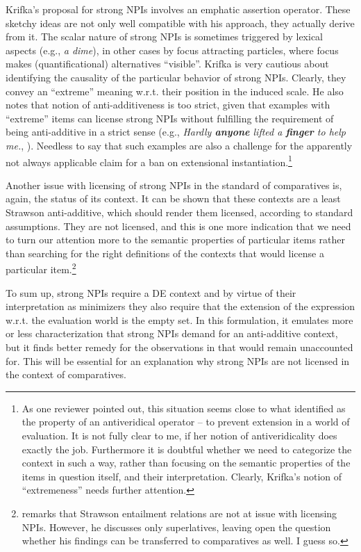 \documentclass[output=paper,colorlinks,citecolor=brown,
]{langscibook}
\begin{document}
Krifka's \citeyearpar{krifka1995} proposal for strong NPIs involves an emphatic assertion operator. These sketchy ideas are not
only well compatible with his approach, they actually derive from it. The scalar nature of strong NPIs is sometimes
triggered by lexical aspects (e.g., \emph{a dime}), in other cases by focus attracting particles, where focus makes
(quantificational) alternatives “visible”. Krifka is very cautious about identifying the causality of the particular
behavior of strong NPIs. Clearly, they convey an ``extreme'' meaning w.r.t. their position in the induced scale. He also
notes that  notion of anti-additiveness is too strict, given that examples with ``extreme'' items
can license strong NPIs without fulfilling the requirement of being anti-additive in a strict sense (e.g., \textit{Hardly \textbf{anyone}
lifted a \textbf{finger} to help me.}, \citealt{krifka1995}). Needless to say that such examples are also a challenge for the apparently not always applicable claim for a ban on
extensional instantiation.\footnote{As one reviewer pointed out, this situation seems close to what \citet{giannak2007} identified
as the property of an antiveridical operator -- to prevent extension in a world of evaluation. It is not fully
clear to me, if her notion of antiveridicality does exactly the job. Furthermore it is doubtful whether we need to categorize the context in such a way, rather than
focusing on the semantic properties of the items in question itself, and their interpretation. Clearly, Krifka's notion of
``extremeness'' needs further attention.}

Another issue with licensing of strong NPIs in the standard of comparatives is, again, the
status of its context. It can be shown that these contexts are a least Strawson anti-additive, which should render them licensed, according
to standard assumptions. They are not licensed, and this is
one more indication that we need to turn our attention more to the semantic properties of particular items rather than
searching for the right definitions of the contexts that would license a particular item.\footnote{\citet{gajewski2010} remarks
that Strawson entailment relations are not at issue with licensing NPIs. However, he discusses only superlatives, leaving open the
question whether his findings can be transferred to comparatives as well. I guess so.}

To sum up, strong NPIs require a DE context and by virtue of their interpretation as minimizers they also require that
the extension of the expression w.r.t. the evaluation world is the empty set. In this formulation, it emulates
more or less \citet{zwarts1998} characterization that strong NPIs demand for an anti-additive context, but it finds better remedy
for the observations in \citet{heim1984} that would remain unaccounted for. This will be essential for an explanation
why strong NPIs are not licensed in the context of comparatives.
\end{document}
